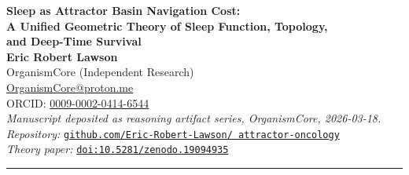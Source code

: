 \documentclass[10pt, a4paper]{article}
\begin{document}
\begin{center}
  {\LARGE\bfseries\color{headergreen}
  Sleep as Attractor Basin Navigation
  Cost:\\[0.3em]
  A Unified Geometric Theory of Sleep
  Function, Topology,\\[0.3em]
  and Deep-Time Survival}\\[0.8em]
  {\normalsize
  \textbf{Eric Robert Lawson}\\
  OrganismCore (Independent Research)\\
  \href{mailto:OrganismCore@proton.me}
  {OrganismCore@proton.me}\\
  ORCID:
  \href{https://orcid.org/0009-0002-0414-6544}
  {0009-0002-0414-6544}\\[0.4em]
  \textit{Manuscript deposited as
  reasoning artifact series,
  OrganismCore, 2026-03-18.}\\
  \textit{Repository:}
  \href{https://github.com/Eric-Robert-Lawson/attractor-oncology}
  {\texttt{github.com/Eric-Robert-Lawson/
  attractor-oncology}}\\
  \textit{Theory paper:}
  \href{https://doi.org/10.5281/zenodo.19094935}
  {\texttt{doi:10.5281/zenodo.19094935}}
  }
\end{center}

\vspace{0.5em}
\noindent\textcolor{rulecolor}
{\rule{\linewidth}{1pt}}
\vspace{0.5em}
\end{document}
